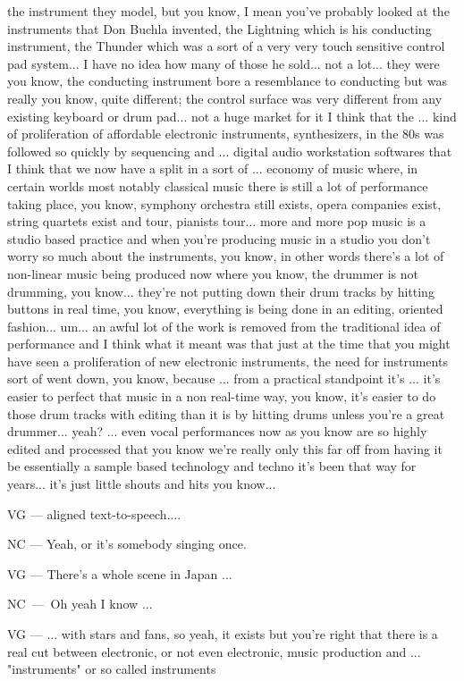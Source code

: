 the instrument they model, but you know, I mean you've probably looked at the instruments that Don Buchla invented, the Lightning which is his conducting instrument, the Thunder which was a sort of a very very touch sensitive control pad system... I have no idea how many of those he sold... not a lot... they were you know, the conducting instrument bore a resemblance to conducting but was really you know, quite different; the control surface was very different from any existing keyboard or drum pad... not a huge market for it I think that the ... kind of proliferation of affordable electronic instruments, synthesizers, in the 80s was followed so quickly by sequencing and ... digital audio workstation softwares that I think that we now have a split in a sort of ... economy of music where, in certain worlds most notably classical music there is still a lot of performance taking place, you know, symphony orchestra still exists, opera companies exist, string quartets exist and tour, pianists tour... more and more pop music is a studio based practice and when you're producing music in a studio you don't worry so much about the instruments, you know, in other words there's a lot of non-linear music being produced now where you know, the drummer is not drumming, you know... they're not putting down their drum tracks by hitting buttons in real time, you know, everything is being done in an editing, oriented fashion... um... an awful lot of the work is removed from the traditional idea of performance and I think what it meant was that just at the time that you might have seen a proliferation of new electronic instruments, the need for instruments sort of went down, you know, because ... from a practical standpoint it's ... it's easier to perfect that music in a non real-time way, you know,  it's easier to do those drum tracks with editing than it is by hitting drums unless you're a great drummer... yeah? ... even vocal performances now as you know are so highly edited and processed that you know we're really only this far off from having it be essentially a sample based technology and techno it's been that way for years...  it's just little shouts and hits you know... 

VG — aligned text-to-speech.... 

NC — Yeah, or it's somebody singing once. 

VG — There's a whole scene in Japan ...

NC — Oh yeah I know ...

VG — ... with stars and fans, so yeah, it exists but you're right that there is a real cut between  electronic, or not even electronic, music production and ... "instruments" or so called instruments 

